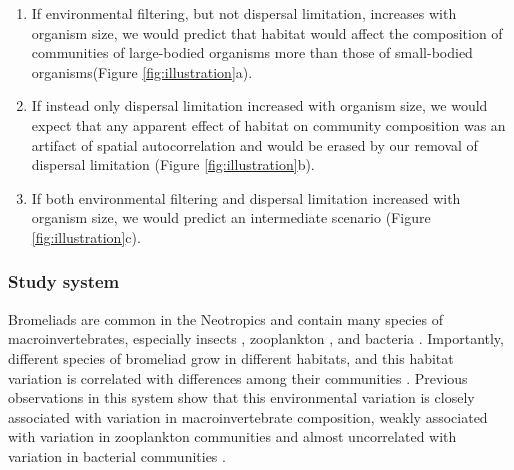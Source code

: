 \begin{enumerate}
\def\labelenumi{\arabic{enumi}.}
\item
  If environmental filtering, but not dispersal limitation, increases
  with organism size, we would predict that habitat would affect the
  composition of communities of large-bodied organisms more than those
  of small-bodied organisms(Figure \ref{fig:illustration}a). 
\item
  If instead only dispersal limitation increased with organism size, we
  would expect that any apparent effect of habitat on community
  composition was an artifact of spatial autocorrelation and would be
  erased by our removal of dispersal limitation (Figure \ref{fig:illustration}b).
\item
  If both environmental filtering and dispersal limitation increased
  with organism size, we would predict an intermediate scenario (Figure
  \ref{fig:illustration}c).
\end{enumerate}

\subsubsection{Study system}\label{study-system}

Bromeliads are common in the Neotropics and contain many species of
macroinvertebrates, especially insects \citep{Frank2009}, zooplankton
\citep{Petermann2015}, and bacteria \citep{Haubrich2009a}. Importantly,
different species of bromeliad grow in different habitats, and this
habitat variation is correlated with differences among their communities
\citep{Marino2012}. Previous observations in this system show that this
environmental variation is closely associated with variation in
macroinvertebrate composition, weakly associated with variation in
zooplankton communities and almost uncorrelated with variation in
bacterial communities \citep{Farjalla2012}.

